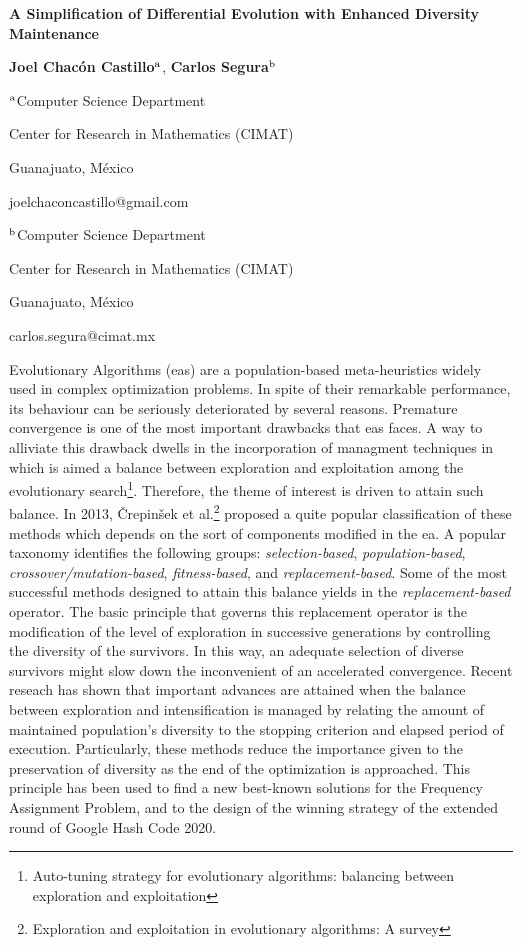 \documentclass[a4paper,12pt]{article}
\newcommand{\EAS}{{\sc eas}}
\newcommand{\EA}{{\sc ea}}
\begin{document}
\centerline{\bf A Simplification of Differential Evolution with Enhanced Diversity Maintenance}

\vspace{12pt}

\centerline{{\bf Joel Chac\'on Castillo$^{\rm a}$},  {\bf Carlos Segura$^{\rm b}$}}

\vspace{12pt}

\centerline{$^{\rm a}$Computer Science Department}
\centerline{Center for Research in Mathematics (CIMAT)}
\centerline{Guanajuato, M\'exico}
\centerline{joelchaconcastillo@gmail.com}

\vspace{12pt}

\centerline{$^{\rm b}$Computer Science Department}
\centerline{Center for Research in Mathematics (CIMAT)}
\centerline{Guanajuato, M\'exico}
\centerline{carlos.segura@cimat.mx}

\vspace{12pt}
\vspace{12pt}

Evolutionary Algorithms (\EAS{}) are a population-based meta-heuristics widely used in complex optimization problems.
%
In spite of their remarkable performance, its behaviour can be seriously deteriorated by several reasons.
%
Premature convergence is one of the most important drawbacks that \EAS{} faces.
%
A way to alliviate this drawback dwells in the incorporation of managment techniques in which is aimed a balance between exploration and exploitation among the evolutionary search\footnote{Auto-tuning strategy for evolutionary algorithms: balancing between exploration and exploitation}.
%
Therefore, the theme of interest is driven to attain such balance.
%
In 2013, {\v{C}}repin{\v{s}}ek et al.\footnote{Exploration and exploitation in evolutionary algorithms: A survey} proposed a quite popular classification of these methods which depends on the sort of components modified in the \EA{}.
%
A popular taxonomy identifies the following groups:
%
\textit{selection-based}, \textit{population-based}, \textit{crossover/mutation-based}, \textit{fitness-based}, and \textit{replacement-based}.
%
Some of the most successful methods designed to attain this balance yields in the \textit{replacement-based} operator.
%
The basic principle that governs this replacement operator is the modification of the level of exploration in successive generations by controlling the diversity of the survivors.
%
In this way, an adequate selection of diverse survivors might slow down the inconvenient of an accelerated convergence.
%
Recent reseach has shown that important advances are attained when the balance between exploration and intensification is managed by relating the amount of maintained population's diversity to the stopping criterion and elapsed period of execution.
%
Particularly, these methods reduce the importance given to the preservation of diversity as the end of the optimization is approached.
%
This principle has been used to find a new best-known solutions for the Frequency Assignment Problem, and to the design of the winning strategy of the extended round of Google Hash Code 2020.
%
%
\end{document}
